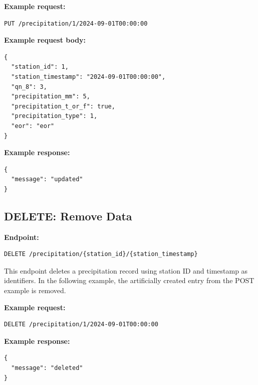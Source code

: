 \textbf{Example request:}
\begin{verbatim}
PUT /precipitation/1/2024-09-01T00:00:00
\end{verbatim}

\textbf{Example request body:}
\begin{verbatim}
{
  "station_id": 1,
  "station_timestamp": "2024-09-01T00:00:00",
  "qn_8": 3,
  "precipitation_mm": 5,
  "precipitation_t_or_f": true,
  "precipitation_type": 1,
  "eor": "eor"
}
\end{verbatim}

\textbf{Example response:}
\begin{verbatim}
{
  "message": "updated"
}
\end{verbatim}

\subsection{DELETE: Remove Data}

\textbf{Endpoint:}
\begin{verbatim}
DELETE /precipitation/{station_id}/{station_timestamp}
\end{verbatim}

This endpoint deletes a precipitation record using station ID and timestamp as identifiers.
In the following example, the artificially created entry from the POST example is removed.
\par\vspace{0.5em}
\textbf{Example request:}
\begin{verbatim}
DELETE /precipitation/1/2024-09-01T00:00:00
\end{verbatim}

\textbf{Example response:}
\begin{verbatim}
{
  "message": "deleted"
}
\end{verbatim}
\cite{chatgpt_spellcheck}